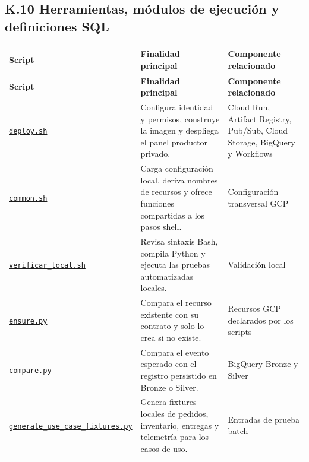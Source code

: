 \documentclass[11pt]{article}
\begin{document}
\subsection*{K.10 Herramientas, módulos de ejecución y definiciones SQL}
\begingroup\scriptsize
\begin{longtable}{@{}>{\raggedright\arraybackslash}p{}>{\raggedright\arraybackslash}p{}>{\raggedright\arraybackslash}p{}@{}}
\toprule
\textbf{Script} & \textbf{Finalidad principal} & \textbf{Componente relacionado} \\
\midrule
\endfirsthead
\toprule
\textbf{Script} & \textbf{Finalidad principal} & \textbf{Componente relacionado} \\
\midrule
\endhead
\href{https://github.com/Codenid/lumina-retail-data-platform/blob/main/implementation/soluciones/productor-datos/deploy.sh}{\texttt{deploy.sh}} & Configura identidad y permisos, construye la imagen y despliega el panel productor privado. & Cloud Run, Artifact Registry, Pub/Sub, Cloud Storage, BigQuery y Workflows \\
\href{https://github.com/Codenid/lumina-retail-data-platform/blob/main/implementation/automatizacion/scripts/common.sh}{\texttt{common.sh}} & Carga configuración local, deriva nombres de recursos y ofrece funciones compartidas a los pasos shell. & Configuración transversal GCP \\
\href{https://github.com/Codenid/lumina-retail-data-platform/blob/main/implementation/automatizacion/scripts/verificar_local.sh}{\texttt{verificar\_\allowbreak{}local.sh}} & Revisa sintaxis Bash, compila Python y ejecuta las pruebas automatizadas locales. & Validación local \\
\href{https://github.com/Codenid/lumina-retail-data-platform/blob/main/implementation/automatizacion/utilidades/ensure.py}{\texttt{ensure.py}} & Compara el recurso existente con su contrato y solo lo crea si no existe. & Recursos GCP declarados por los scripts \\
\href{https://github.com/Codenid/lumina-retail-data-platform/blob/main/implementation/automatizacion/utilidades/compare.py}{\texttt{compare.py}} & Compara el evento esperado con el registro persistido en Bronze o Silver. & BigQuery Bronze y Silver \\
\href{https://github.com/Codenid/lumina-retail-data-platform/blob/main/implementation/automatizacion/utilidades/generate_use_case_fixtures.py}{\texttt{generate\_\allowbreak{}use\_\allowbreak{}case\_\allowbreak{}fixtures.py}} & Genera fixtures locales de pedidos, inventario, entregas y telemetría para los casos de uso. & Entradas de prueba batch \\

\end{longtable}
\end{document}
